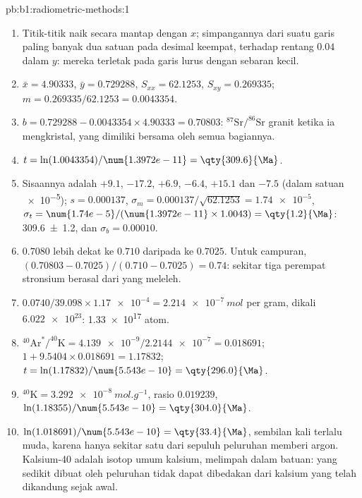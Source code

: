 \begin{solution}{pb:b1:radiometric-methods:1}
\begin{enumerate}
  \item Titik-titik naik secara mantap dengan $x$; simpangannya dari suatu garis paling
        banyak dua satuan pada desimal keempat, terhadap rentang $0.04$ dalam $y$: mereka
        terletak pada garis lurus dengan sebaran kecil.
  \item $\bar x = 4.90333$, $\bar y = 0.729288$, $S_{xx} = 62.1253$, $S_{xy} =
        0.269335$; $m = 0.269335/62.1253 = 0.0043354$.
  \item $b = 0.729288 - 0.0043354 \times 4.90333 = 0.70803$: $^{87}\mathrm{Sr}/^{86}\mathrm{Sr}$
        granit ketika ia mengkristal, yang dimiliki bersama oleh semua bagiannya.
  \item $t = \ln(1.0043354)/\num{1.3972e-11} = \qty{309.6}{\Ma}$.
  \item Sisaannya adalah $+9.1$, $-17.2$, $+6.9$, $-6.4$, $+15.1$ dan $-7.5$ (dalam satuan
        \num{e-5}); $s = 0.000137$, $\sigma_m = 0.000137/\sqrt{62.1253} =
        \num{1.74e-5}$, $\sigma_t = \num{1.74e-5}/(\num{1.3972e-11} \times 1.0043)
        = \qty{1.2}{\Ma}$: \qty[uncertainty-mode=separate]{309.6(12)}{\Ma}, dan
        $\sigma_b = 0.00010$.
  \item $0.7080$ lebih dekat ke  $0.710$ daripada ke  $0.7025$. Untuk campuran,
        $(0.70803 - 0.7025)/(0.710 - 0.7025) = 0.74$: sekitar tiga perempat stronsium berasal
        dari  yang meleleh.
  \item $0.0740/39.098 \times \num{1.17e-4} = \qty{2.214e-7}{mol}$ per gram, dikali
        $\num{6.022e23}$: \num{1.33e17} atom.
  \item $^{40}\mathrm{Ar}^*/^{40}\mathrm{K} = \num{4.139e-9}/\num{2.2144e-7} =
        0.018691$; $1 + 9.5404 \times 0.018691 = 1.17832$; $t =
        \ln(1.17832)/\num{5.543e-10} = \qty{296.0}{\Ma}$.
  \item $^{40}\mathrm{K} = \qty{3.292e-8}{mol.g^{-1}}$, rasio $0.019239$,
        $\ln(1.18355)/\num{5.543e-10} = \qty{304.0}{\Ma}$.
  \item $\ln(1.018691)/\num{5.543e-10} = \qty{33.4}{\Ma}$, sembilan kali terlalu muda,
        karena hanya sekitar satu dari sepuluh peluruhan memberi argon. Kalsium-40 adalah
        isotop umum kalsium, melimpah dalam batuan: yang sedikit dibuat oleh peluruhan tidak
        dapat dibedakan dari kalsium yang telah dikandung  sejak awal.

\end{enumerate}
\end{solution}
